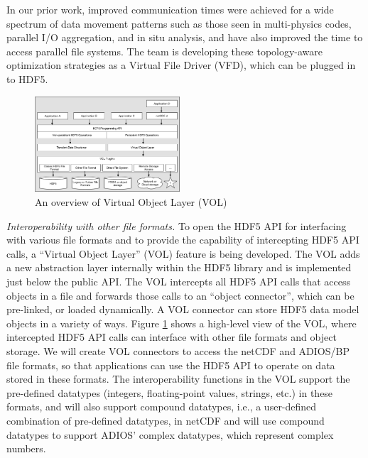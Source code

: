 In our prior work, improved communication times were achieved for a wide spectrum of data movement patterns such as those seen in multi-physics codes, parallel I/O aggregation, and in situ analysis, and have also improved the time to access parallel file systems. The team is developing these topology-aware optimization strategies as a Virtual File Driver (VFD), which can be plugged in to HDF5. 

\begin{figure}
  \begin{center}
    \includegraphics[width=0.48\textwidth]{projects/2.3.4-DataViz/2.3.4.08-ExaHDF5/VOL-Overview.pdf}
  \end{center}
  \caption{An overview of Virtual Object Layer (VOL)}
  \label{fig:vol-overview}
\end{figure}

\textit{Interoperability with other file formats.} To open the HDF5 API for interfacing with various file formats and to provide the capability of intercepting HDF5 API calls, a ``Virtual Object Layer'' (VOL) feature is being developed. The VOL adds a new abstraction layer internally within the HDF5 library and is implemented just below the public API. The VOL intercepts all HDF5 API calls that access objects in a file and forwards those calls to an “object connector”, which can be pre-linked, or loaded dynamically. A VOL connector can store HDF5 data model objects in a variety of ways. Figure \ref{fig:vol-overview} shows a high-level view of the VOL, where intercepted HDF5 API calls can interface with other file formats and object storage. We will create VOL connectors to access the netCDF and ADIOS/BP file formats, so that applications can use the HDF5 API to operate on data stored in these formats. The interoperability functions in the VOL support the pre-defined datatypes (integers, floating-point values, strings, etc.) in these formats, and will also support compound datatypes, i.e., a user-defined combination of pre-defined datatypes, in netCDF and will use compound datatypes to support ADIOS’ complex datatypes, which represent complex numbers.


